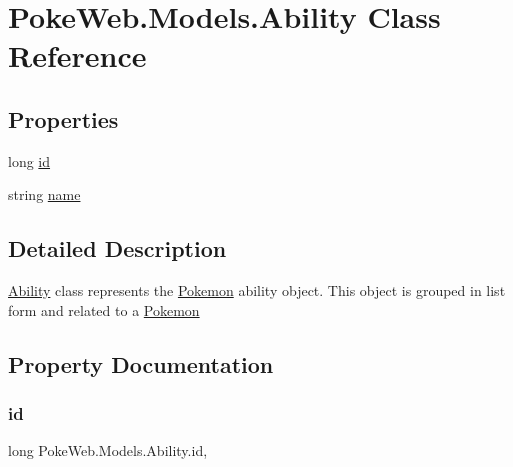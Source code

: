 \hypertarget{class_poke_web_1_1_models_1_1_ability}{}\section{Poke\+Web.\+Models.\+Ability Class Reference}
\label{class_poke_web_1_1_models_1_1_ability}
\subsection*{Properties}
\begin{DoxyCompactItemize}
\item 
long \mbox{\hyperlink{class_poke_web_1_1_models_1_1_ability_a08cae568c0769373081b005a48311da2}{id}}
\item 
string \mbox{\hyperlink{class_poke_web_1_1_models_1_1_ability_aa67ea4b0ec6b00a54c6c41315e57ee59}{name}}
\end{DoxyCompactItemize}


\subsection{Detailed Description}
\mbox{\hyperlink{class_poke_web_1_1_models_1_1_ability}{Ability}} class represents the \mbox{\hyperlink{class_poke_web_1_1_models_1_1_pokemon}{Pokemon}} ability object. This object is grouped in list form and related to a \mbox{\hyperlink{class_poke_web_1_1_models_1_1_pokemon}{Pokemon}} 

\subsection{Property Documentation}
\mbox{\label{class_poke_web_1_1_models_1_1_ability_a08cae568c0769373081b005a48311da2}} 
\subsubsection{\texorpdfstring{id}{id}}
{\footnotesize\ttfamily long Poke\+Web.\+Models.\+Ability.\+id\hspace{0.3cm}{\ttfamily [get]}, {\ttfamily [set]}}

